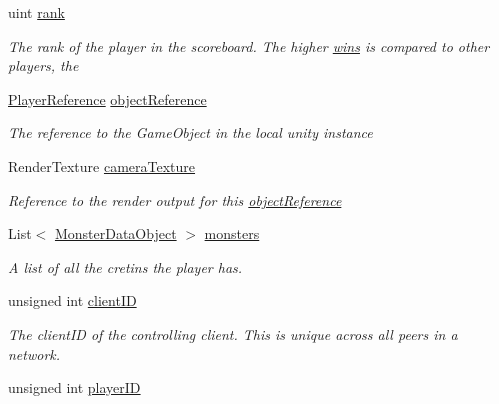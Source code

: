 \begin{DoxyCompactItemize}
uint \hyperlink{class_game_state_1_1_player_a6cf0778cc27a824eac211b8b29b3dfcc}{rank}
\begin{DoxyCompactList}\small\item\em The rank of the player in the scoreboard. The higher \hyperlink{class_game_state_1_1_player_a3a4d13459cad9bd58e058ddc6387af70}{wins} is compared to other players, the \end{DoxyCompactList}\item 
\hyperlink{class_player_reference}{Player\-Reference} \hyperlink{class_game_state_1_1_player_aebf24de01e14055dc940d0493753484f}{object\-Reference}
\begin{DoxyCompactList}\small\item\em The reference to the Game\-Object in the local unity instance \end{DoxyCompactList}\item 
Render\-Texture \hyperlink{class_game_state_1_1_player_ac1f7e0b5bc335c32c3be71e3653787a6}{camera\-Texture}
\begin{DoxyCompactList}\small\item\em Reference to the render output for this \hyperlink{class_game_state_1_1_player_aebf24de01e14055dc940d0493753484f}{object\-Reference} \end{DoxyCompactList}\item 
List$<$ \hyperlink{class_monster_data_object}{Monster\-Data\-Object} $>$ \hyperlink{class_game_state_1_1_player_a4412b3835e68a55b00610438118cdb16}{monsters}
\begin{DoxyCompactList}\small\item\em A list of all the cretins the player has. \end{DoxyCompactList}\item 
\hypertarget{class_game_state_1_1_player_a1bef4cd92306bd5cf330c4756e63686c}{unsigned int \hyperlink{class_game_state_1_1_player_a1bef4cd92306bd5cf330c4756e63686c}{client\-I\-D}}\label{class_game_state_1_1_player_a1bef4cd92306bd5cf330c4756e63686c}

\begin{DoxyCompactList}\small\item\em The client\-I\-D of the controlling client. This is unique across all peers in a network. \end{DoxyCompactList}\item 
\hypertarget{class_game_state_1_1_player_ac71d68698435ee1c625237b1f2b377cb}{unsigned int \hyperlink{class_game_state_1_1_player_ac71d68698435ee1c625237b1f2b377cb}{player\-I\-D}}\label{class_game_state_1_1_player_ac71d68698435ee1c625237b1f2b377cb}


\end{DoxyCompactItemize}
